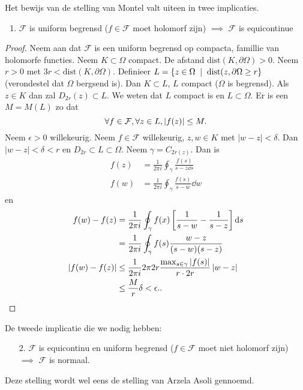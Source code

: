 Het bewijs van de stelling van Montel valt uiteen in twee implicaties. 
\begin{enumerate}
	\item  $\mathcal{F} $ is uniform begrensd ($f \in \mathcal{F}$ moet holomorf zijn) $\implies $ $\mathcal{F} $ is equicontinue
\end{enumerate}
\begin{proof}
	Neem aan dat $\mathcal{F} $ is een uniform begrensd op compacta, famillie van holomorfe functies. Neem $K \subset  \Omega$ compact. 
	De afstand $\text{dist}(K, \partial \Omega) > 0$. 
	Neem $r > 0$ met $3 r < \text{dist}(K, \partial \Omega)$.
	Definieer $L = \{z \in \Omega \st \text{dist}(z, \partial \Omega \ge r\} $ (verondestel dat $\Omega$ bergsend is). 
	Dan $K \subset L$, $L$ compact ($\Omega$ is begrensd). 
	Als $z \in K$ dan zal $D_{2r}(z) \subset L$. 
	We weten dat $L$ compact is en $L \subset \Omega$. 
	Er is een $M  = M(L)$ zo dat \[
		\forall f \in \mathcal{F} , \forall z \in L, \left| f(z) \right| \le M
	.\] 
	Neem $\epsilon > 0$ willekeurig. 
	Neem $f \in \mathcal{F} $ willekeurig, $z, w \in K$ met $|w  - z| < \delta$. 
	Dan $|w - z| < \delta < r$ en $D_{2r} \subset L \subset  \Omega$. 
	Neem $\gamma = C_{2r (z)}$. 
	Dan is 
	\begin{align*}
		f(z) &= \frac{1}{2\pi i } \oint_{\gamma} \frac{f(s)}{s  - z \dd s} \\
		f(w) &=  \frac{1}{2 \pi i} \oint_{\gamma}  \frac{f(s)}{s - w}\dd w 
	\end{align*}
	en 
	\begin{align*}
		f(w) - f(z) &= \frac{1}{2 \pi i}\oint_{\gamma} f(x) \left[ \frac{1}{s - w} - \frac{1}{s - z} \right]  \mathrm{d} s \\
			    &= \frac{1}{2 \pi i} \oint_{\gamma} f(s) \frac{w - z}{(s-w)(s-z)} \\
		\left| f(w) - f(z) \right| &\le \frac{1}{2 \pi i}2\pi 2r \frac{\max_{s \in \gamma}|f(s)|}{r \cdot 2r}\left| w - z \right|\\
				  &\le \frac{M}{r}\delta < \epsilon.
	.\end{align*}
\end{proof}
De tweede implicatie die we nodig hebben: 
\begin{itemize}
	\item [2.] $\mathcal{F}  $ is equicontinu en uniform begrensd ($f \in \mathcal{F} $ moet niet holomorf zijn) $\implies$ $\mathcal{F}  $ is normaal.
\end{itemize}
Deze stelling wordt wel eens de stelling van Arzela Asoli gennoemd. 
